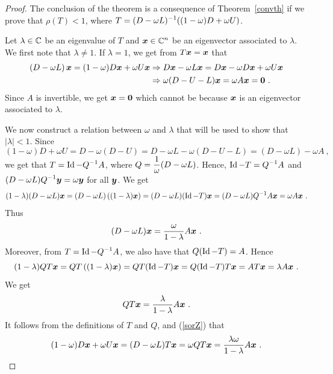 \begin{proof}
The conclusion of the theorem is a consequence of Theorem~\ref{convth}
if we prove that $\rho(T)<1$, where
$\displaystyle T = (D-\omega L)^{-1}((1-\omega)D + \omega U)$.

Let $\lambda \in \mathbb{C}$ be an eigenvalue of $T$ and
$\displaystyle \bm{x} \in \mathbb{C}^n$
be an eigenvector associated to $\lambda$.  We first note that
$\lambda \neq 1$.  If $\lambda = 1$, we get from $T\bm{x} = \bm{x}$
that
\begin{align*}
\left(D - \omega L\right) \bm{x} = (1-\omega)D \bm{x} + \omega U \bm{x}
&\Rightarrow 
D\bm{x} - \omega L \bm{x} = D\bm{x} - \omega D \bm{x} + \omega U
\bm{x} \\
&\Rightarrow
\omega ( D - U - L)\bm{x} = \omega A \bm{x} = \bm{0} \ .
\end{align*}
Since $A$ is invertible, we get $\bm{x} = \bm{0}$ which cannot be
because $\bm{x}$ is an eigenvector associated to $\lambda$.

We now construct a relation between $\omega$ and $\lambda$ that will
be used to show that $|\lambda| < 1$.  Since
\[
  (1-\omega)D + \omega U = D - \omega(D -U)
  = D - \omega L - \omega ( D - U - L) = (D - \omega L) - \omega A \ ,
\]
we get that $\displaystyle T = \operatorname{Id} - Q^{-1}A$, where
$\displaystyle Q = \frac{1}{\omega}(D-\omega L)$.
Hence, $\displaystyle \operatorname{Id} - T = Q^{-1}A$ and
$\displaystyle (D-\omega L)Q^{-1} \bm{y} = \omega \bm{y}$ for all $\bm{y}$.
We get
\[
(1-\lambda) (D-\omega L) \bm{x}
= (D - \omega L)\left( (1-\lambda) \bm{x} \right)
= (D - \omega L)(\operatorname{Id} - T)\bm{x}
= (D - \omega L) Q^{-1}A\bm{x}
= \omega A\bm{x} \ .
\]
Thus
\begin{equation}\label{sorA}
  (D-\omega L) \bm{x} = \frac{\omega}{1-\lambda} A\bm{x} \ .
\end{equation}
Moreover, from $\displaystyle T = \operatorname{Id} - Q^{-1}A$, we also have that
$Q(\operatorname{Id} - T) = A$.  Hence
\[
(1-\lambda) QT\bm{x}
=  QT\left( (1-\lambda)\bm{x}\right)
= QT(\operatorname{Id} - T)\bm{x} = Q(\operatorname{Id} - T)T\bm{x}
= AT\bm{x} = \lambda A \bm{x} \ .
\]
We get
\begin{equation}\label{sorZ}
QT\bm{x} = \frac{\lambda}{1-\lambda} A \bm{x} \ .
\end{equation}
It follows from the definitions of $T$ and $Q$, and (\ref{sorZ}) that
\begin{equation}\label{sorB}
(1-\omega)D\VEC{x} + \omega U\VEC{x} = (D-\omega L)T\VEC{x}
= \omega QT\VEC{x} = \frac{\lambda \omega}{1-\lambda} A\VEC{x} \ .
\end{equation}


\end{proof}
